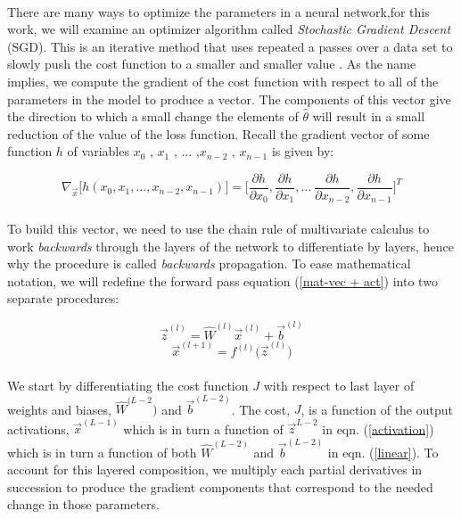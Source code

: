 \documentclass[12pt,letterpaper]{article}
\begin{document}
\paragraph*{}There are many ways to optimize the parameters in a neural network,for this work, we will examine an optimizer algorithm called \textit{Stochastic Gradient Descent} (SGD). This is an iterative method that uses repeated a passes over a data set to slowly push the cost function to a smaller and smaller value \cite{Geron,Goodfellow,Loy}. As the name implies, we compute the gradient of the cost function with respect to all of the parameters in the model to produce a vector. The components of this vector give the direction to which a small change the elements of $\hat{\theta}$ will result in a small reduction of the value of the loss function. Recall the gradient vector of some function $h$ of variables $x_0$ , $x_1$ , ... ,$x_{n-2}$ , $x_{n-1}$ is given by:

\begin{equation}
\label{gradient}
\nabla_{\vec{x}}\Big[ h(x_0,x_1,...,x_{n-2},x_{n-1}) \Big] 
			= \Big[ \frac{\partial h}{\partial x_0} , \frac{\partial h}{\partial x_1} , ...\
					\frac{\partial h}{\partial x_{n-2}} , \frac{\partial h}{\partial x_{n-1}} \Big]^T
\end{equation}

\paragraph*{}To build this vector, we need to use the chain rule of multivariate calculus to work \textit{backwards} through the layers of the network to differentiate by layers, hence why the procedure is called \textit{backwards} propagation. To ease mathematical notation, we will redefine the forward pass equation (\ref{mat-vec + act}) into two separate procedures:

\begin{equation}
\label{linear}
\vec{z}^{(l)} = \hat{W}^{(l)} \vec{x}^{(l)} + \vec{b}^{(l)}
\end{equation}
\begin{equation}
\label{activation}
\vec{x}^{(l+1)} = f^{(l)} \big( \vec{z}^{(l)} \big)
\end{equation}

\paragraph*{}We start by differentiating the cost function $J$ with respect to last layer of weights and biases, $\hat{W}^{(L-2})$ and $\vec{b}^{(L-2)}$. The cost, $J$, is a function of the output activations, $\vec{x}^{(L-1)}$ which is in turn a function of $\vec{z}^{L-2}$ in eqn. (\ref{activation}) which is in turn a function of both $\hat{W}^{(L-2)}$ and $\vec{b}^{(L-2)}$ in eqn. (\ref{linear}). To account for this layered composition, we multiply each partial derivatives in succession to produce the gradient components that correspond to the needed change in those parameters.
\end{document}
